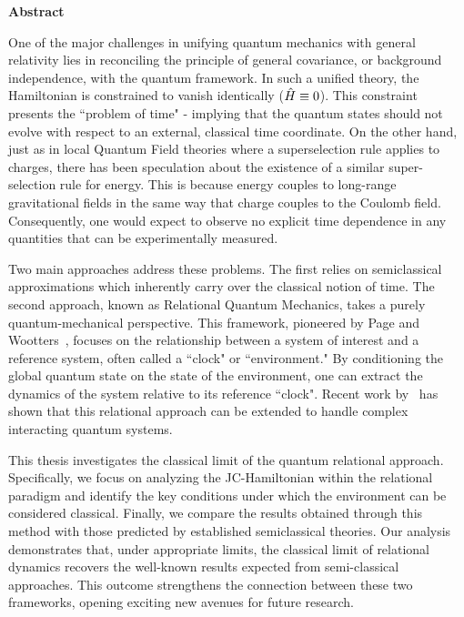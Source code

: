 \begin{center}
    {\Large\bfseries\sffamily Abstract}
\end{center}
One of the major challenges in unifying quantum mechanics with general relativity lies in reconciling the principle of general covariance, or background independence, with the quantum framework. In such a unified theory, the Hamiltonian is constrained to vanish identically ($\Hat{H} \equiv 0$). This constraint presents the ``problem of time" -  implying that the quantum states should not evolve with respect to an external, classical time coordinate.  On the other hand, just as in local Quantum Field theories where a superselection rule applies to charges, there has been speculation about the existence of a similar super-selection rule for energy. This is because energy couples to long-range gravitational fields in the same way that charge couples to the Coulomb field. Consequently, one would expect to observe no explicit time dependence in any quantities that can be experimentally measured.

Two main approaches address these problems. The first relies on semiclassical approximations which inherently carry over the classical notion of time. The second approach, known as Relational Quantum Mechanics, takes a purely quantum-mechanical perspective. This framework, pioneered by Page and Wootters~\cite{page1983evolution}, focuses on the relationship between a system of interest and a reference system, often called a ``clock" or ``environment." By conditioning the global quantum state on the state of the environment, one can extract the dynamics of the system relative to its reference ``clock". Recent work by~\cite{Gemsheim:2023izg} has shown that this relational approach can be extended to handle complex interacting quantum systems.

This thesis investigates the classical limit of the quantum relational approach. Specifically, we focus on analyzing the JC-Hamiltonian within the relational paradigm and identify the key conditions under which the environment can be considered classical. Finally, we compare the results obtained through this method with those predicted by established semiclassical theories. Our analysis demonstrates that, under appropriate limits, the classical limit of relational dynamics recovers the well-known results expected from semi-classical approaches. This outcome strengthens the connection between these two frameworks, opening exciting new avenues for future research.
\newpage